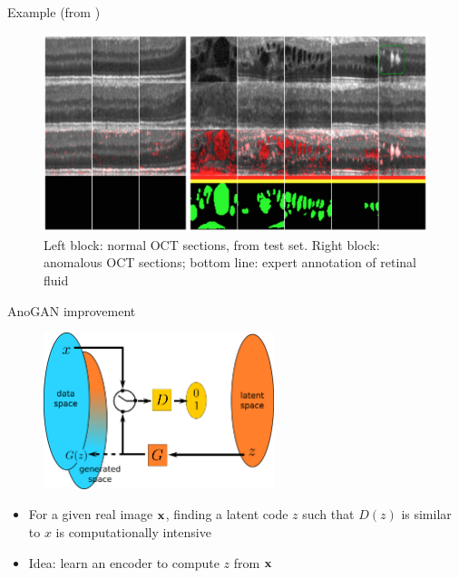 \documentclass[xcolor=pdftex,dvipsnames,table,mathserif]{beamer}
\begin{document}
\begin{frame}{Example (from \cite{schlegl_unsupervised_2017})}


  \begin{figure}[ht]
    \centering
    \includegraphics[width=\textwidth]{res_oct}
    \caption{Left block: normal OCT sections, from test set. Right block: anomalous OCT sections; bottom line: expert annotation of retinal fluid}
  \end{figure}

\end{frame}


\begin{frame}{AnoGAN improvement}

  \begin{figure}[ht]
    \centering
    \includegraphics[width=0.6\textwidth]{gan2}
  \end{figure}

  \begin{itemize}
  \item For a given real image $\mathbf{x}$, finding a latent code $z$ such that $D(z)$ is similar to $x$ is computationally intensive
  \item Idea: learn an encoder to compute $z$ from $\mathbf{x}$
  \end{itemize}

\end{frame}
\end{document}
